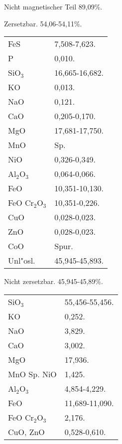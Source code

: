 \documentclass[a4paper, 11pt, oneside]{article}
\begin{document}
\begin{center}
Nicht magnetischer Teil 89,09\%.
\end{center}

\begin{center}
Zersetzbar. 54,06-54,11\%.
\end{center}

\begin{table}[H]
    \centering
    \begin{tabular}{l l}
        FeS & 7,508-7,623. \\
        P & 0,010. \\
        SiO$_{3}$ & 16,665-16,682. \\
        KO & 0,013. \\
        NaO & 0,121. \\
        CaO & 0,205-0,170. \\
        MgO & 17,681-17,750. \\
        MnO & Sp. \\
        NiO & 0,326-0,349. \\
        Al$_{2}$O$_{3}$ & 0,064-0,066. \\
        FeO & 10,351-10,130. \\
        FeO Cr$_{2}$O$_{3}$ & 10,351-0,226. \\
        CuO & 0,028-0,023. \\
        ZnO & 0,028-0,023. \\
        CoO & Spur. \\
        Unl"osl. & 45,945-45,893. \\
    \end{tabular}
\end{table}

\begin{center}
Nicht zersetzbar. 45,945-45,89\%.
\end{center}

\begin{table}[H]
    \centering
    \begin{tabular}{l l}
        SiO$_{3}$ & 55,456-55,456. \\
        KO & 0,252. \\
        NaO & 3,829. \\
        CaO & 3,002. \\
        MgO & 17,936. \\
        MnO Sp. NiO & 1,425. \\
        Al$_{2}$O$_{3}$ & 4,854-4,229. \\
        FeO & 11,689-11,090. \\
        FeO Cr$_{2}$O$_{3}$ & 2,176. \\
        CuO, ZnO & 0,528-0,610. \\
    \end{tabular}
\end{table}
\end{document}
